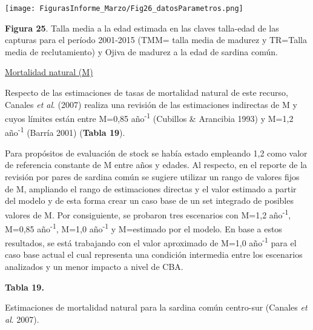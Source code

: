 \documentclass[
  spanish,
]{article}
\begin{document}
\vspace{0.5cm}

\begin{center}
\texttt{[image: FigurasInforme\_Marzo/Fig26\_datosParametros.png]}
\end{center}

\small

\textbf{Figura 25}. Talla media a la edad estimada en las claves
talla-edad de las capturas para el período 2001-2015 (TMM= talla media
de madurez y TR=Talla media de reclutamiento) y Ojiva de madurez a la
edad de sardina común. \vspace{0.5cm} \normalsize

\underline{Mortalidad natural (M)}

Respecto de las estimaciones de tasas de mortalidad natural de este
recurso, Canales \emph{et al}. (2007) realiza una revisión de las
estimaciones indirectas de M y cuyos límites están entre M=0,85
año\textsuperscript{-1} (Cubillos \& Arancibia 1993) y M=1,2
año\textsuperscript{-1} (Barría 2001) (\textbf{Tabla 19}).

Para propósitos de evaluación de stock se había estado empleando 1,2
como valor de referencia constante de M entre años y edades. Al
respecto, en el reporte de la revisión por pares de sardina común se
sugiere utilizar un rango de valores fijos de M, ampliando el rango de
estimaciones directas y el valor estimado a partir del modelo y de esta
forma crear un caso base de un set integrado de posibles valores de M.
Por consiguiente, se probaron tres escenarios con M=1,2
año\textsuperscript{-1}, M=0,85 año\textsuperscript{-1}, M=1,0
año\textsuperscript{-1} y M=estimado por el modelo. En base a estos
resultados, se está trabajando con el valor aproximado de M=1,0
año\textsuperscript{-1} para el caso base actual el cual representa una
condición intermedia entre los escenarios analizados y un menor impacto
a nivel de CBA. \vspace{0.5cm}

\small
\begin{center} 
\textbf{Tabla 19.}
\end{center}
\begin{center} 
\vspace{-0.2cm} Estimaciones de mortalidad natural para la sardina común centro-sur (Canales \textit{et al}. 2007).
\end{center}
\vspace{-0.2cm}
\end{document}
